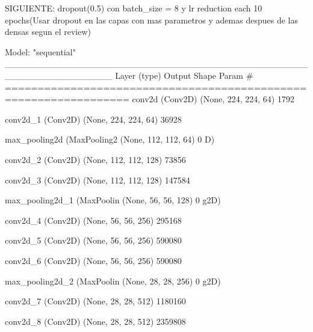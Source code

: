\documentclass[11pt, a4paper]{article} %
\begin{document}
SIGUIENTE:  dropout(0.5) con batch_size = 8 y lr reduction each 10 epochs(Usar dropout en las capas con mas parametros y ademas despues de las densas segun el review)

Model: "sequential"
_________________________________________________________________
 Layer (type)                Output Shape              Param #   
=================================================================
 conv2d (Conv2D)             (None, 224, 224, 64)      1792      
                                                                 
 conv2d_1 (Conv2D)           (None, 224, 224, 64)      36928     
                                                                 
 max_pooling2d (MaxPooling2  (None, 112, 112, 64)      0         
 D)                                                              
                                                                 
 conv2d_2 (Conv2D)           (None, 112, 112, 128)     73856     
                                                                 
 conv2d_3 (Conv2D)           (None, 112, 112, 128)     147584    
                                                                 
 max_pooling2d_1 (MaxPoolin  (None, 56, 56, 128)       0         
 g2D)                                                            
                                                                 
 conv2d_4 (Conv2D)           (None, 56, 56, 256)       295168    
                                                                 
 conv2d_5 (Conv2D)           (None, 56, 56, 256)       590080    
                                                                 
 conv2d_6 (Conv2D)           (None, 56, 56, 256)       590080    
                                                                 
 max_pooling2d_2 (MaxPoolin  (None, 28, 28, 256)       0         
 g2D)                                                            
                                                                 
 conv2d_7 (Conv2D)           (None, 28, 28, 512)       1180160   
                                                                 
 conv2d_8 (Conv2D)           (None, 28, 28, 512)       2359808   
                                                                 
\end{document}
